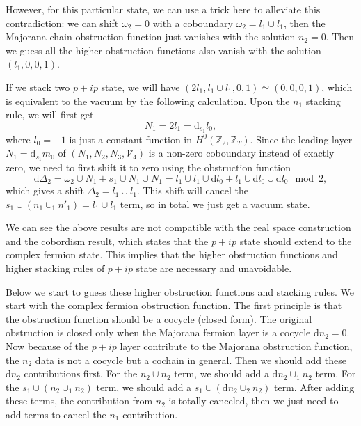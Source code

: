 \documentclass[%
 reprint,
 amsmath,amssymb,
 aps,
prb,
]{revtex4-2}
\begin{document}
However, for this particular state, we can use a trick here to alleviate this contradiction: we can shift $\omega_2 = 0$ with a coboundary $\omega_2 = l_1 \cup l_1$, then the Majorana chain obstruction function just vanishes with the solution $n_2 = 0$.
Then we guess all the higher obstruction functions also vanish with the solution $(l_1, 0, 0, 1)$.

If we stack two $p+ip$ state, we will have $(2l_1, l_1 \cup l_1, 0, 1) \simeq (0, 0, 0, 1)$, which is equivalent to the vacuum by the following calculation.
Upon the $n_1$ stacking rule, we will first get 
\begin{equation}
N_1 = 2l_1 = \mathrm{d} _{s_1} l_0 ,
\end{equation}
where $l_0 = -1$ is just a constant function in $H^0(\mathbb Z_2, \mathbb Z_T)$.
Since the leading layer $N_1 = \mathrm{d} _{s_1} m_0$ of $(N_1, N_2, N_3, \mathcal{V} _4)$ is a non-zero coboundary instead of exactly zero, we need to first shift it to zero using the obstruction function
\begin{equation}
\mathrm{d} \Delta_{2} =\omega _{2} \cup N_{1} +s_{1} \cup N_{1} \cup N_{1} = l_1 \cup l_1 \cup \mathrm{d} l_0 + l_1 \cup \mathrm{d}l_0 \cup \mathrm{d} l_0  \mod 2,
\end{equation}
which gives a shift $\Delta _2 = l_1 \cup l_1$.
This shift will cancel the $s_1 \cup (n_1 \cup_1 n'_1) = l_1 \cup l_1$ term, so in total we just get a vacuum state.

We can see the above results are not compatible with the real space construction and the cobordism result, which states that the $p+ip$ state should extend to the complex fermion state.
This implies that the higher obstruction functions and higher stacking rules of $p+ip$ state are necessary and unavoidable.

Below we start to guess these higher obstruction functions and stacking rules.
We start with the complex fermion obstruction function.
The first principle is that the obstruction function should be a cocycle (closed form).
The original obstruction is closed only when the Majorana fermion layer is a cocycle $\mathrm{d} n_2 = 0$.
Now because of the $p+ip$ layer contribute to the Majorana obstruction function, the $n_2$ data is not a cocycle but a cochain in general.
Then we should add these $\mathrm{d} n_2$ contributions first.
For the $n_2 \cup n_2$ term, we should add a $\mathrm{d} n_2 \cup_1 n_2$ term.
For the $s_1 \cup (n_2 \cup_1 n_2)$ term, we should add a $s_1 \cup (\mathrm{d} n_2 \cup_2 n_2)$ term.
After adding these terms, the contribution from $n_2$ is totally canceled, then we just need to add terms to cancel the $n_1$ contribution.
\end{document}
